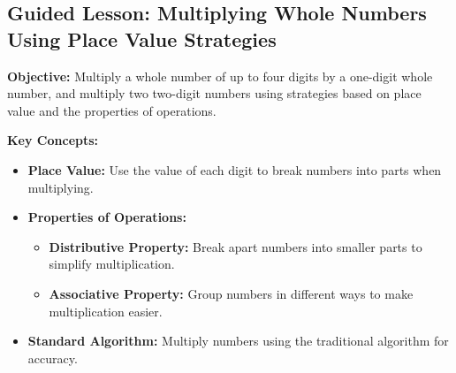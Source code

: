 \documentclass[12pt]{article}
\title{}
\date{}
\begin{document}
\subsection*{Guided Lesson: Multiplying Whole Numbers Using Place Value Strategies}
\onehalfspacing

\begin{tcolorbox}[colframe=black!40, colback=gray!5, 
coltitle=black, colbacktitle=black!20, fonttitle=\bfseries\Large, 
title=Learning Objective, halign title=center, left=5pt, right=5pt, top=5pt, bottom=15pt]
\textbf{Objective:} Multiply a whole number of up to four digits by a one-digit whole number, and multiply two two-digit numbers using strategies based on place value and the properties of operations.
\end{tcolorbox}

\vspace{1em}

\begin{tcolorbox}[colframe=black!60, colback=white, 
coltitle=black, colbacktitle=black!15, fonttitle=\bfseries\Large, 
title=Key Concepts and Vocabulary, halign title=center, left=10pt, right=10pt, top=10pt, bottom=15pt]
\textbf{Key Concepts:}
\begin{itemize}
    \item \textbf{Place Value:} Use the value of each digit to break numbers into parts when multiplying.
    \item \textbf{Properties of Operations:}
    \begin{itemize}
        \item \textbf{Distributive Property:} Break apart numbers into smaller parts to simplify multiplication.
        \item \textbf{Associative Property:} Group numbers in different ways to make multiplication easier.
    \end{itemize}
    \item \textbf{Standard Algorithm:} Multiply numbers using the traditional algorithm for accuracy.
\end{itemize}
\end{tcolorbox}

\vspace{1em}
\end{document}
